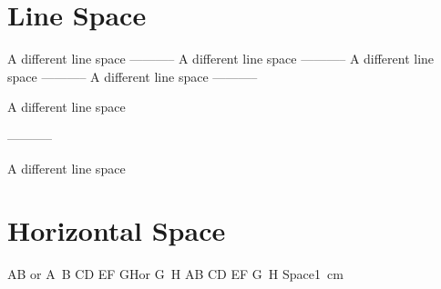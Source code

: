 \documentclass{article}
\begin{document}
    \section{Line Space} 
        {
            \linespread{1.5} \selectfont
            A different\newline
            line space
        }\newline
        -----------\newline
        { A different\newline
        line space}\newline
        -----------\newline
        {\onehalfspacing A different\newline
        line space}\newline
        -----------\newline
        {\doublespacing A different\newline
        line space}\newline
        -----------\newline
        \begin{spacing}{1.5}
            A different\newline
            line space
        \end{spacing}
        -----------\newline
        \begin{doublespace}
            A different\newline
            line space
        \end{doublespace} 

    \section{Horizontal Space}
        A\thinspace B or A\, B\newline
        C\negthinspace D\newline
        E\enspace F\newline
        G\nobreakspace H\newline or G~H
        A\quad B\newline
        C\qquad D\newline
        E\enskip F\newline
        G\ H\newline 
        Space\hspace{1cm}1\, cm
\end{document}
